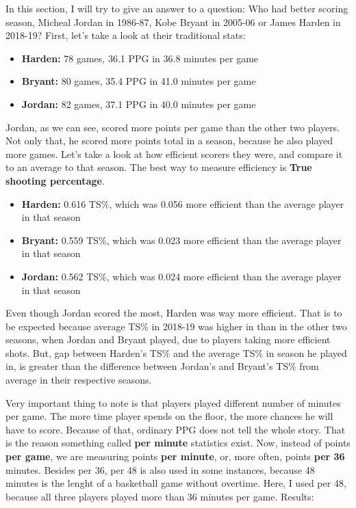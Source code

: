 \documentclass[a4paper]{article}
\begin{document}
In this section, I will try to give an answer to a question: Who had better scoring season, Micheal Jordan in 1986-87, Kobe Bryant in 2005-06 or James Harden in 2018-19? First, let's take a look at their traditional stats:

\begin{itemize}
	\item \textbf{Harden:} 78 games, 36.1 PPG in 36.8 minutes per game
	\item \textbf{Bryant:} 80 games, 35.4 PPG in 41.0 minutes per game
	\item \textbf{Jordan:} 82 games, 37.1 PPG in 40.0 minutes per game
\end{itemize}

Jordan, as we can see, scored more points per game than the other two players. Not only that, he scored more points total in a season, because he also played more games. Let's take a look at how efficient scorers they were, and compare it to an average to that season. The best way to measure efficiency is \textbf{True shooting percentage}.

\begin{itemize}
	\item \textbf{Harden:} 0.616 TS\%, which was 0.056 more efficient than the average player in that season
	\item \textbf{Bryant:} 0.559 TS\%, which was 0.023 more efficient than the average player in that season
	\item \textbf{Jordan:} 0.562 TS\%, which was 0.024 more efficient than the average player in that season
\end{itemize}

Even though Jordan scored the most, Harden was way more efficient. That is to be expected because average TS\% in 2018-19 was higher in than in the other two seasons, when Jordan and Bryant played, due to players taking more efficient shots. But, gap between Harden's TS\% and the average TS\% in season he played in, is greater than the difference between Jordan's and Bryant's TS\% from average in their respective seasons.

Very important thing to note is that players played different number of minutes per game. The more time player spends on the floor, the more chances he will have to score. Because of that, ordinary PPG does not tell the whole story. That is the reason something called \textbf{per minute} statistics exist. Now, instead of points \textbf{per game}, we are measuring points \textbf{per minute}, or, more often, points \textbf{per 36} minutes. Besides per 36, per 48 is also used in some instances, because 48 minutes is the lenght of a basketball game without overtime. Here, I used per 48, because all three players played more than 36 minutes per game. Results:
\end{document}
